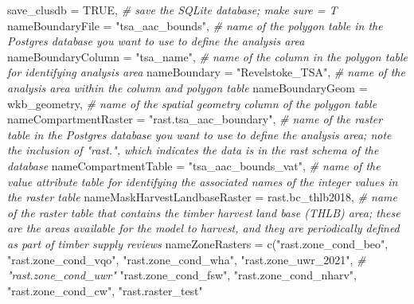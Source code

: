 \documentclass[
]{article}
\newenvironment{Shaded}{\begin{snugshade}}{\end{snugshade}}
\newcommand{\AttributeTok}[1]{\textcolor[rgb]{0.77,0.63,0.00}{#1}}
\newcommand{\CommentTok}[1]{\textcolor[rgb]{0.56,0.35,0.01}{\textit{#1}}}
\newcommand{\ConstantTok}[1]{\textcolor[rgb]{0.00,0.00,0.00}{#1}}
\newcommand{\FunctionTok}[1]{\textcolor[rgb]{0.00,0.00,0.00}{#1}}
\newcommand{\NormalTok}[1]{#1}
\newcommand{\StringTok}[1]{\textcolor[rgb]{0.31,0.60,0.02}{#1}}
\begin{document}
\begin{Shaded}
\begin{Highlighting}[]
                         \AttributeTok{save\_clusdb =} \ConstantTok{TRUE}\NormalTok{, }\CommentTok{\# save the SQLite database; make sure = T}
                         \AttributeTok{nameBoundaryFile =} \StringTok{"tsa\_aac\_bounds"}\NormalTok{, }\CommentTok{\# name of the polygon table in the Postgres database you want to use to define the analysis area}
                         \AttributeTok{nameBoundaryColumn =} \StringTok{"tsa\_name"}\NormalTok{, }\CommentTok{\# name of the column in the polygon table for identifying analysis area}
                         \AttributeTok{nameBoundary =} \StringTok{"Revelstoke\_TSA"}\NormalTok{, }\CommentTok{\# name of the analysis area within the column and polygon table }
                         \AttributeTok{nameBoundaryGeom =} \StringTok{\textquotesingle{}wkb\_geometry\textquotesingle{}}\NormalTok{, }\CommentTok{\# name of the spatial geometry column of the polygon table }
                         \AttributeTok{nameCompartmentRaster =} \StringTok{"rast.tsa\_aac\_boundary"}\NormalTok{, }\CommentTok{\# name of the raster table in the Postgres database you want to use to define the analysis area; note the inclusion of "rast.", which indicates the data is in the rast schema of the database}
                         \AttributeTok{nameCompartmentTable =} \StringTok{"tsa\_aac\_bounds\_vat"}\NormalTok{, }\CommentTok{\# name of the value attribute table for identifying the associated names of the integer values in the raster table}
                         \AttributeTok{nameMaskHarvestLandbaseRaster =} \StringTok{\textquotesingle{}rast.bc\_thlb2018\textquotesingle{}}\NormalTok{, }\CommentTok{\# name of the raster table that contains the timber harvest land base (THLB) area; these are the areas available for the model to harvest, and they are periodically defined as part of timber supply reviews}
                         \AttributeTok{nameZoneRasters =} \FunctionTok{c}\NormalTok{(}\StringTok{"rast.zone\_cond\_beo"}\NormalTok{, }
                                             \StringTok{"rast.zone\_cond\_vqo"}\NormalTok{, }
                                             \StringTok{"rast.zone\_cond\_wha"}\NormalTok{, }
                                             \StringTok{"rast.zone\_uwr\_2021"}\NormalTok{, }\CommentTok{\# "rast.zone\_cond\_uwr"}
                                             \StringTok{"rast.zone\_cond\_fsw"}\NormalTok{, }
                                             \StringTok{"rast.zone\_cond\_nharv"}\NormalTok{, }
                                             \StringTok{"rast.zone\_cond\_cw"}\NormalTok{,}
                                             \StringTok{"rast.raster\_test"} 

\end{Highlighting}
\end{Shaded}
\end{document}

